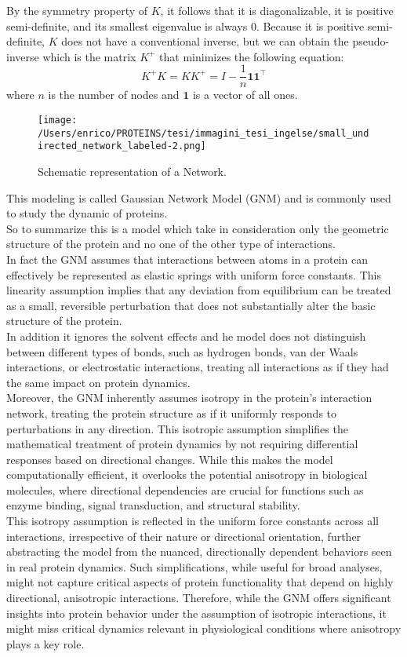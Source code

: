 \documentclass[English, Lau, oneside]{sapthesis}
\begin{document}
By the symmetry property of \( K \), it follows that it is diagonalizable, it is positive semi-definite, and its smallest eigenvalue is always 0.
Because it is positive semi-definite, \( K \) does not have a conventional inverse, but we can obtain the pseudo-inverse which is the matrix \( K^+ \) that minimizes the following equation: 
\[
K^+ K = K K^+ = I - \frac{1}{n} \mathbf{1} \mathbf{1}^\top
\]
where \( n \) is the number of nodes and \( \mathbf{1} \) is a vector of all ones.

\begin{figure}[h]
    \centering
    \texttt{[image: /Users/enrico/PROTEINS/tesi/immagini\_tesi\_ingelse/small\_undirected\_network\_labeled-2.png]}
    \caption{Schematic representation of a Network.}
    \label{fig:Network}
\end{figure}




This modeling is called Gaussian Network Model (GNM) and is commonly used to study the dynamic of proteins.\\
So to summarize this is a model which take in consideration only the geometric structure of the protein and no one of the other type of interactions. \\
In fact the GNM assumes that interactions between atoms in a protein can effectively be represented as elastic springs with uniform force constants. 
This linearity assumption implies that any deviation from equilibrium can be treated as a small, 
reversible perturbation that does not substantially alter the basic structure of the protein.\\
In addition it ignores the solvent effects and he model does not distinguish between different types of bonds, 
such as hydrogen bonds, van der Waals interactions, or electrostatic interactions, 
treating all interactions as if they had the same impact on protein dynamics.\\
Moreover, the GNM inherently assumes isotropy in the protein's interaction network, treating the protein structure as if it uniformly responds to perturbations in any direction. This isotropic assumption simplifies the mathematical treatment of protein dynamics by not requiring differential responses based on directional changes. While this makes the model computationally efficient, it overlooks the potential anisotropy in biological molecules, where directional dependencies are crucial for functions such as enzyme binding, signal transduction, and structural stability.\\
This isotropy assumption is reflected in the uniform force constants across all interactions, irrespective of their nature or directional orientation, further abstracting the model from the nuanced, directionally dependent behaviors seen in real protein dynamics. Such simplifications, while useful for broad analyses, might not capture critical aspects of protein functionality that depend on highly directional, anisotropic interactions. Therefore, while the GNM offers significant insights into protein behavior under the assumption of isotropic interactions, it might miss critical dynamics relevant in physiological conditions where anisotropy plays a key role.\\
\end{document}
